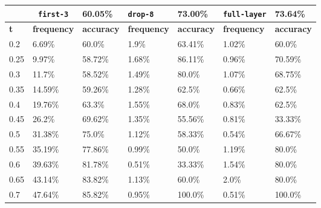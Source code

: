 
\begin{table}[t]
\centering
\begin{tabular}{lllllll} %
\hline

\multicolumn{1}{c}{}& 
\multicolumn{1}{c}{\texttt{first-3}} & \multicolumn{1}{l|}{60.05\%} 
& \multicolumn{1}{l}{\texttt{drop-8}} & \multicolumn{1}{l|}{73.00\%}
& \multicolumn{1}{l}{\texttt{full-layer}} & 73.64\%
\\ \hline
\multicolumn{1}{l|}{\textbf{t}} &
\multicolumn{1}{l|}{\textbf{frequency}} & 
\multicolumn{1}{l|}{\textbf{accuracy}} & 
\multicolumn{1}{l|}{\textbf{frequency}} & 
\multicolumn{1}{l|}{\textbf{accuracy}} & 
\multicolumn{1}{l|}{\textbf{frequency}} & 
\multicolumn{1}{l|}{\textbf{accuracy}} \\ \hline
	\multicolumn{1}{l|}{0.2}&  6.69\% & \multicolumn{1}{l|}{60.0\%}& 1.9\% & \multicolumn{1}{l|}{63.41\%}& 1.02\% & 60.0\%\\ 
\multicolumn{1}{l|}{0.25}&  9.97\% & \multicolumn{1}{l|}{58.72\%}& 1.68\% & \multicolumn{1}{l|}{86.11\%}& 0.96\% & 70.59\%\\ 
\multicolumn{1}{l|}{0.3}&  11.7\% & \multicolumn{1}{l|}{58.52\%}& 1.49\% & \multicolumn{1}{l|}{80.0\%}& 1.07\% & 68.75\%\\ 
\multicolumn{1}{l|}{0.35}&  14.59\% & \multicolumn{1}{l|}{59.26\%}& 1.28\% & \multicolumn{1}{l|}{62.5\%}& 0.66\% & 62.5\%\\ 
\multicolumn{1}{l|}{0.4}&  19.76\% & \multicolumn{1}{l|}{63.3\%}& 1.55\% & \multicolumn{1}{l|}{68.0\%}& 0.83\% & 62.5\%\\ 
\multicolumn{1}{l|}{0.45}&  26.2\% & \multicolumn{1}{l|}{69.62\%}& 1.35\% & \multicolumn{1}{l|}{55.56\%}& 0.81\% & 33.33\%\\ 
\multicolumn{1}{l|}{0.5}&  31.38\% & \multicolumn{1}{l|}{75.0\%}& 1.12\% & \multicolumn{1}{l|}{58.33\%}& 0.54\% & 66.67\%\\ 
\multicolumn{1}{l|}{0.55}&  35.19\% & \multicolumn{1}{l|}{77.86\%}& 0.99\% & \multicolumn{1}{l|}{50.0\%}& 1.19\% & 80.0\%\\ 
\multicolumn{1}{l|}{0.6}&  39.63\% & \multicolumn{1}{l|}{81.78\%}& 0.51\% & \multicolumn{1}{l|}{33.33\%}& 1.54\% & 80.0\%\\ 
\multicolumn{1}{l|}{0.65}&  43.14\% & \multicolumn{1}{l|}{83.82\%}& 1.13\% & \multicolumn{1}{l|}{60.0\%}& 2.0\% & 80.0\%\\ 
\multicolumn{1}{l|}{0.7}&  47.64\% & \multicolumn{1}{l|}{85.82\%}& 0.95\% & \multicolumn{1}{l|}{100.0\%}& 0.51\% & 100.0\%\\ 

\end{tabular}
\end{table}
